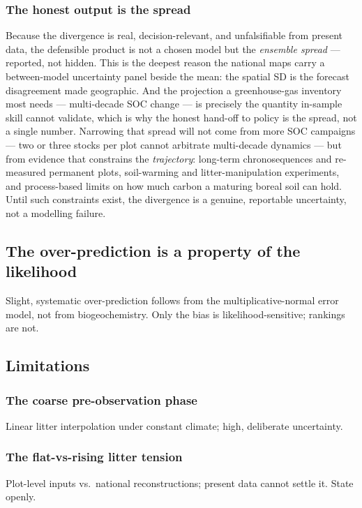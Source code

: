 \documentclass[11pt]{article}
\begin{document}
\subsubsection{The honest output is the spread}
Because the divergence is real, decision-relevant, and unfalsifiable from present data,
the defensible product is not a chosen model but the \emph{ensemble spread} --- reported,
not hidden. This is the deepest reason the national maps carry a between-model
uncertainty panel beside the mean: the spatial SD is the forecast disagreement made
geographic. And the projection a greenhouse-gas inventory most needs --- multi-decade SOC
change --- is precisely the quantity in-sample skill cannot validate, which is why the
honest hand-off to policy is the spread, not a single number.
Narrowing that spread will not come from more SOC campaigns --- two or three stocks per
plot cannot arbitrate multi-decade dynamics --- but from evidence that constrains the
\emph{trajectory}: long-term chronosequences and re-measured permanent plots, soil-warming
and litter-manipulation experiments, and process-based limits on how much carbon a maturing
boreal soil can hold. Until such constraints exist, the divergence is a genuine, reportable
uncertainty, not a modelling failure.

\subsection{The over-prediction is a property of the likelihood}
Slight, systematic over-prediction follows from the multiplicative-normal
error model, not from biogeochemistry. Only the bias is likelihood-sensitive;
rankings are not.

\subsection{Limitations}

\subsubsection{The coarse pre-observation phase}
Linear litter interpolation under constant climate; high, deliberate
uncertainty.

\subsubsection{The flat-vs-rising litter tension}
Plot-level inputs vs.\ national reconstructions; present data cannot settle
it. State openly.
\end{document}
